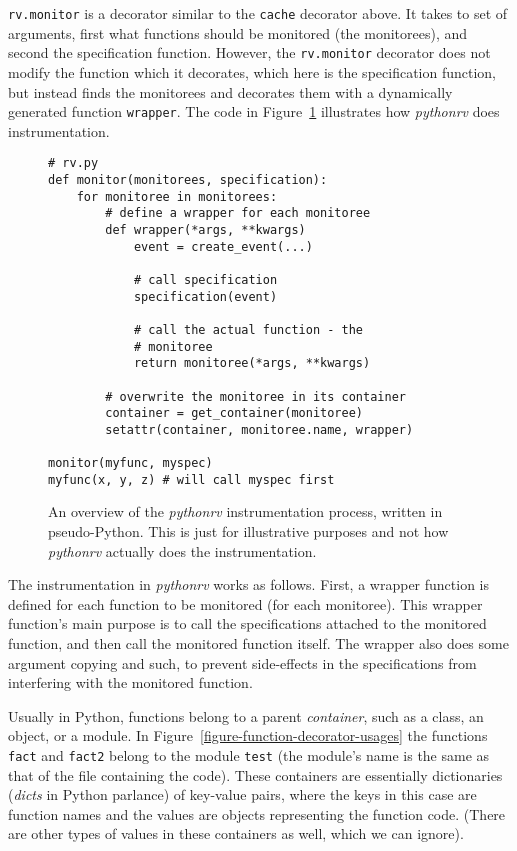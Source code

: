 \texttt{rv.monitor} is a decorator similar to the \texttt{cache} decorator
above. It takes to set of arguments, first what functions should be monitored
(the monitorees), and second the specification function. However, the
\texttt{rv.monitor} decorator does not modify the function which it decorates,
which here is the specification function, but instead finds the monitorees and
decorates them with a dynamically generated function \texttt{wrapper}. The code
in Figure~\ref{figure-instrumentation-overview} illustrates how
\textit{pythonrv} does instrumentation.

\begin{figure}[h!]
	\begin{center}
	\begin{minipage}{0.7\textwidth}
	\begin{lstlisting}
# rv.py
def monitor(monitorees, specification):
	for monitoree in monitorees:
		# define a wrapper for each monitoree
		def wrapper(*args, **kwargs)
			event = create_event(...)

			# call specification
			specification(event)

			# call the actual function - the
			# monitoree
			return monitoree(*args, **kwargs)

		# overwrite the monitoree in its container
		container = get_container(monitoree)
		setattr(container, monitoree.name, wrapper)

monitor(myfunc, myspec)
myfunc(x, y, z) # will call myspec first
	\end{lstlisting}
	\end{minipage}
	\end{center}

	\caption{An overview of the \textit{pythonrv} instrumentation process,
		written in pseudo-Python. This is just for illustrative purposes and not
		how \textit{pythonrv} actually does the instrumentation.}
	\label{figure-instrumentation-overview}
\end{figure}

The instrumentation in \textit{pythonrv} works as follows. First, a wrapper
function is defined for each function to be monitored (for each monitoree).
This wrapper function's main purpose is to call the specifications attached to
the monitored function, and then call the monitored function itself. The
wrapper also does some argument copying and such, to prevent side-effects in
the specifications from interfering with the monitored function.

Usually in Python, functions belong to a parent \textit{container}, such as a
class, an object, or a module\footnotemark. In
Figure~\ref{figure-function-decorator-usages} the functions \texttt{fact} and
\texttt{fact2} belong to the module \texttt{test} (the module's name is the
same as that of the file containing the code). These containers are essentially
dictionaries (\textit{dicts} in Python parlance) of key-value pairs, where the
keys in this case are function names and the values are objects representing
the function code. (There are other types of values in these containers as
well, which we can ignore).

